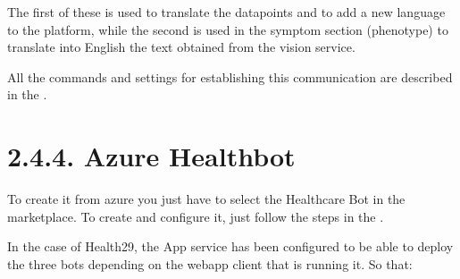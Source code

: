 \documentclass[letterpaper,10pt,english]{sphinxmanual}
\begin{document}
The first of these is used to translate the datapoints and to add a new language to the platform, while the second is used in the symptom section (phenotype) to translate into English the text obtained from the vision service.

All the commands and settings for establishing this communication are described in the .


\section{2.4.4. Azure Healthbot}
\label{\detokenize{pages/SW/Code:azure-healthbot}}
To create it from azure you just have to select the Healthcare Bot in the marketplace.
To create and configure it, just follow the steps in the .

In the case of Health29, the App service  has been configured to be able to deploy the three bots depending on the webapp client that is running it. So that:
\end{document}
